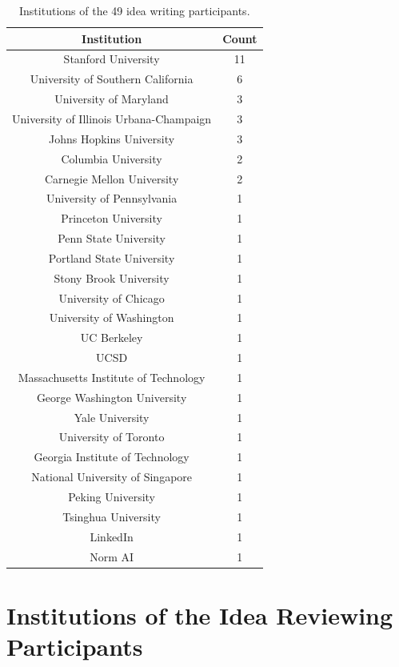 \begin{table}[ht]
\centering
\begin{tabular}{c c} 
 \hline
 Institution & Count \\ 
 \hline
 Stanford University & 11 \\
 University of Southern California & 6  \\
 University of Maryland & 3 \\
 University of Illinois Urbana-Champaign & 3 \\
 Johns Hopkins University & 3 \\
 Columbia University & 2 \\
 Carnegie Mellon University & 2 \\
 University of Pennsylvania & 1 \\
 Princeton University & 1 \\
 Penn State University & 1 \\
Portland State University & 1 \\
 Stony Brook University & 1 \\
 University of Chicago & 1 \\
 University of Washington & 1 \\
 UC Berkeley & 1 \\
 UCSD & 1 \\
 Massachusetts Institute of Technology & 1 \\
 George Washington University & 1 \\
 Yale University & 1 \\
 University of Toronto & 1 \\
 Georgia Institute of Technology & 1 \\
 National University of Singapore & 1 \\
 Peking University & 1 \\
 Tsinghua University & 1 \\
 LinkedIn & 1 \\
 Norm AI & 1 \\
 \hline
\end{tabular}
\caption{Institutions of the 49 idea writing participants.}
\label{table:idea_participants_institution}
\end{table}


\newpage 



\section{Institutions of the Idea Reviewing Participants}




